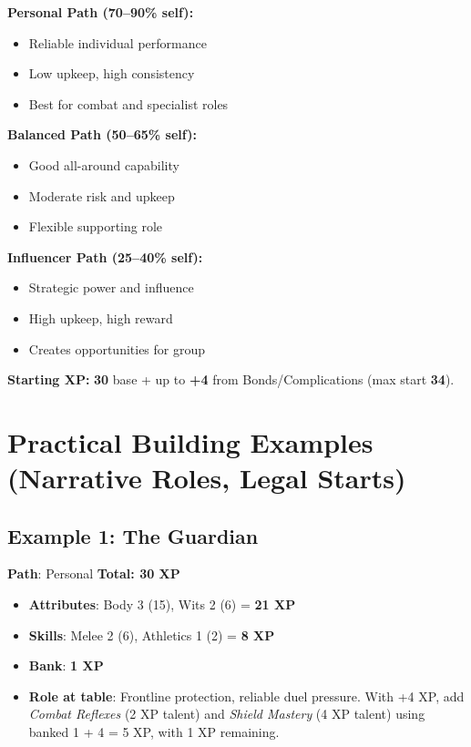 \begin{tcolorbox}[colback=green!5!white,colframe=green!75!black,title=XP Path Quick Reference,fonttitle=\bfseries]
\textbf{Personal Path (70--90\% self):}
\begin{itemize}
\item Reliable individual performance
\item Low upkeep, high consistency
\item Best for combat and specialist roles
\end{itemize}

\textbf{Balanced Path (50--65\% self):}
\begin{itemize}
\item Good all-around capability
\item Moderate risk and upkeep
\item Flexible supporting role
\end{itemize}

\textbf{Influencer Path (25--40\% self):}
\begin{itemize}
\item Strategic power and influence
\item High upkeep, high reward
\item Creates opportunities for group
\end{itemize}

\textbf{Starting XP:} \textbf{30} base \;+\; up to \textbf{+4} from Bonds/Complications (max start \textbf{34}).
\end{tcolorbox}

\section{Practical Building Examples (Narrative Roles, Legal Starts)}

\subsection*{Example 1: The Guardian}
\textbf{Path}: Personal \quad \textbf{Total: 30 XP}
\begin{itemize}
\item \textbf{Attributes}: Body 3 (15), Wits 2 (6) = \textbf{21 XP}
\item \textbf{Skills}: Melee 2 (6), Athletics 1 (2) = \textbf{8 XP}
\item \textbf{Bank}: \textbf{1 XP}
\item \textbf{Role at table}: Frontline protection, reliable duel pressure. With +4 XP, add \emph{Combat Reflexes} (2 XP talent) and \emph{Shield Mastery} (4 XP talent) using banked 1 + 4 = 5 XP, with 1 XP remaining.
\end{itemize}

